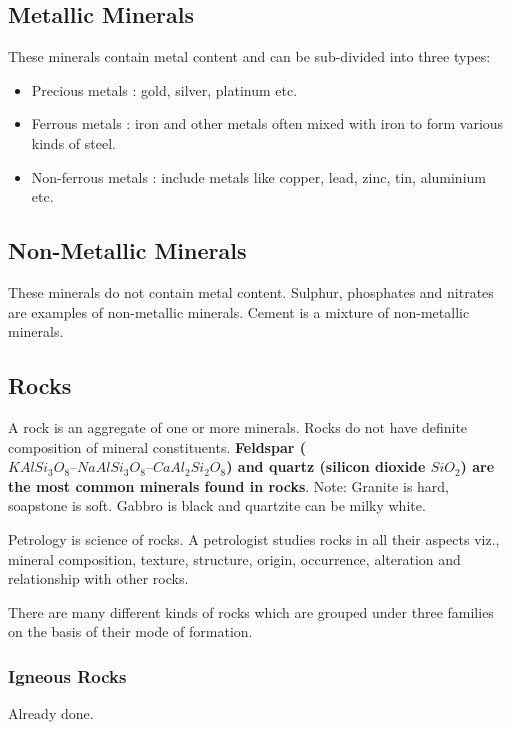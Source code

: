 \documentclass[8pt, a4paper, oneside, twocolumn]{extarticle}
\begin{document}
\subsection{Metallic Minerals}
These minerals contain metal content and can
be sub-divided into three types:
\begin{itemize}
  \item  Precious metals : gold, silver, platinum etc.
  \item Ferrous metals : iron and other metals often mixed with iron to form various kinds of steel.
  \item Non-ferrous metals : include metals like copper, lead, zinc, tin, aluminium etc.
\end{itemize}
\subsection{Non-Metallic Minerals}
These minerals do not contain metal content. Sulphur, phosphates and nitrates are examples of non-metallic minerals. Cement is a mixture of non-metallic minerals.
\subsection{Rocks}
A rock is an aggregate of one or more minerals. Rocks do not have definite composition of mineral constituents. \textbf{Feldspar ($KAlSi_3O_8 – NaAlSi_3O_8 – CaAl_2Si_2O_8$) and quartz (silicon dioxide $SiO_2$) are the most common minerals found in rocks}. Note: Granite is hard, soapstone is soft. Gabbro is black and quartzite can be milky white.

Petrology is science of rocks. A petrologist studies rocks in all their aspects viz., mineral composition, texture, structure, origin, occurrence, alteration and relationship with other rocks.

There are many different kinds of rocks which are grouped under three families on the basis of their mode of formation.

\subsubsection{Igneous Rocks}
Already done.
\end{document}
